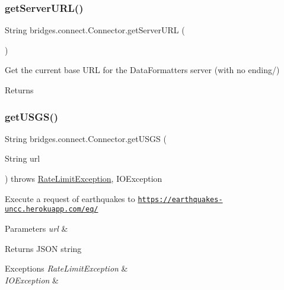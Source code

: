 \subsubsection{\texorpdfstring{get\+Server\+U\+R\+L()}{getServerURL()}}
{\footnotesize\ttfamily String bridges.\+connect.\+Connector.\+get\+Server\+U\+RL (\begin{DoxyParamCaption}{ }\end{DoxyParamCaption})}

Get the current base U\+RL for the Data\+Formatters server (with no ending/) \begin{DoxyReturn}{Returns}

\end{DoxyReturn}
\mbox{\label{classbridges_1_1connect_1_1_connector_a1781405c9b38c338bce042bf7ff23eaf}} 
\subsubsection{\texorpdfstring{get\+U\+S\+G\+S()}{getUSGS()}}
{\footnotesize\ttfamily String bridges.\+connect.\+Connector.\+get\+U\+S\+GS (\begin{DoxyParamCaption}\item[{String}]{url }\end{DoxyParamCaption}) throws \hyperlink{classbridges_1_1validation_1_1_rate_limit_exception}{Rate\+Limit\+Exception}, I\+O\+Exception}

Execute a request of earthquakes to \href{https://earthquakes-uncc.herokuapp.com/eq/}{\tt https\+://earthquakes-\/uncc.\+herokuapp.\+com/eq/} 
\begin{DoxyParams}{Parameters}
{\em url} & \\
\hline
\end{DoxyParams}
\begin{DoxyReturn}{Returns}
J\+S\+ON string 
\end{DoxyReturn}

\begin{DoxyExceptions}{Exceptions}
{\em Rate\+Limit\+Exception} & \\
\hline
{\em I\+O\+Exception} & \\
\hline
\end{DoxyExceptions}
\mbox{\label{classbridges_1_1connect_1_1_connector_a2318cd93d18ef58285598f6f9cdf727b}} 

